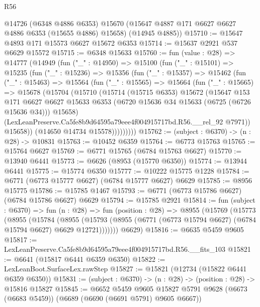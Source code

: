 \begin{lexlean}{R56}
\begin{coremodule}
      @14726
      (@6348 @4886 @6353)
      @15670
      (@15647 @4887 @171 @6627 @6627 @4886 @6353 (@15655 @4886) @15658)
      (@14945 @4885))
@15710 := @15647 @4893 @171 @15573 @6627 @15672 @6353
@15714 := @15637 @2921 @537 @6629 @15572
@15715 := @6348 @15633
@15760 := fun (value : @28) =>
  @14777
    (@14949
      (fun ("_" : @14950) =>
      @15100
        (fun ("_" : @15101) =>
        @15235
          (fun ("_" : @15236) =>
          @15356
            (fun ("_" : @15357) =>
            @15462
              (fun ("_" : @15463) =>
              @15564
                (fun ("_" : @15565) =>
                @15664
                  (fun ("_" : @15665) =>
                  @15678
                    (@15704
                      (@15710
                        (@15714
                          (@15715 @6353)
                          @15672
                          (@15647
                            @153
                            @171
                            @6627
                            @6627
                            @15633
                            @6353
                            (@6720 @15636 @34 @15633 (@6725 (@6726 @15636 @34)))
                            @15658)
                          (LexLeanPreserve.Ca5fe8b9d64595a79eee4f004915717bd.R56.__rel_92 @7971))
                        @15658))
                    (@14650 @14734 @15578)))))))))
@15762 := (subject : @6370) -> (n : @28) -> @10831
@15763 := @10452 @6359
@15764 := @6773 @15763
@15765 := @15764 @6627
@15769 := @6771 @15765 (@6784 @15763 @6627)
@15770 := @13940 @6441
@15773 := @6626 (@8953 (@15770 @6350))
@15774 := @13944 @6441
@15775 := @15774 @6350
@15777 := @10222 @15775 @1228
@15784 := @6771 (@6773 @15777 @6627) (@6784 @15777 @6627) @6629
@15785 := @8956 @15775
@15786 := @15785 @1467
@15793 := @6771 (@6773 @15786 @6627) (@6784 @15786 @6627) @6629
@15794 := @15785 @2921
@15814 := fun (subject : @6370) =>
  fun (n : @28) =>
  fun (position : @28) =>
  @8955
    (@15769
      (@15773
        (@8955
          (@15784
            (@8955
              (@15793 (@8955 (@6771 (@6773 @15794 @6627) (@6784 @15794 @6627) @6629 @12721)))))))
      @6629)
@15816 := @6635 @5459 @9605
@15817 := LexLeanPreserve.Ca5fe8b9d64595a79eee4f004915717bd.R56.__fits_103
@15821 := @6641 (@15817 @6441 @6359 @6350)
@15822 := LexLeanBoot.SurfaceLex.rawStep
@15827 := @15821 (@12734 (@15822 @6441 @6359 @6350))
@15831 := (subject : @6370) -> (n : @28) -> (position : @28) -> @15816 @15827
@15845 := @6652
    @5459
    @9605
    @15827
    @5791
    @9628
    (@6673 (@6683 @5459))
    (@6689 (@6690 (@6691 @5791) @9605 @6667))

\end{coremodule}
\end{lexlean}
